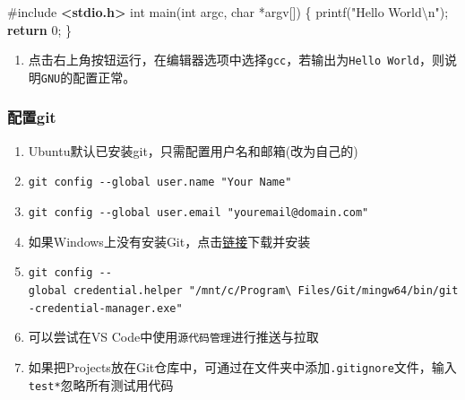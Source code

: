 \documentclass[
]{article}
\newenvironment{Shaded}{}{}
\newcommand{\ControlFlowTok}[1]{\textcolor[rgb]{0.00,0.44,0.13}{\textbf{#1}}}
\newcommand{\DataTypeTok}[1]{\textcolor[rgb]{0.56,0.13,0.00}{#1}}
\newcommand{\DecValTok}[1]{\textcolor[rgb]{0.25,0.63,0.44}{#1}}
\newcommand{\ImportTok}[1]{\textcolor[rgb]{0.00,0.50,0.00}{\textbf{#1}}}
\newcommand{\NormalTok}[1]{#1}
\newcommand{\OperatorTok}[1]{\textcolor[rgb]{0.40,0.40,0.40}{#1}}
\newcommand{\PreprocessorTok}[1]{\textcolor[rgb]{0.74,0.48,0.00}{#1}}
\newcommand{\SpecialCharTok}[1]{\textcolor[rgb]{0.25,0.44,0.63}{#1}}
\newcommand{\StringTok}[1]{\textcolor[rgb]{0.25,0.44,0.63}{#1}}
\begin{document}
\begin{Shaded}
	\begin{Highlighting}[]
		\PreprocessorTok{\#include }\ImportTok{\textless{}stdio.h\textgreater{}}
		\DataTypeTok{int}\NormalTok{ main}\OperatorTok{(}\DataTypeTok{int}\NormalTok{ argc}\OperatorTok{,} \DataTypeTok{char} \OperatorTok{*}\NormalTok{argv}\OperatorTok{[])}
		\OperatorTok{\{}
		\NormalTok{    printf}\OperatorTok{(}\StringTok{"Hello World}\SpecialCharTok{\textbackslash{}n}\StringTok{"}\OperatorTok{);}
		\ControlFlowTok{return} \DecValTok{0}\OperatorTok{;}
		\OperatorTok{\}}
	\end{Highlighting}
\end{Shaded}

\begin{enumerate}[resume]
	\def\labelenumi{\arabic{enumi}.}
	\item
	      点击右上角按钮运行，在编辑器选项中选择\texttt{gcc}，若输出为\texttt{Hello\ World}，则说明\texttt{GNU}的配置正常。
\end{enumerate}

\subsubsection{配置git}\label{ux914dux7f6egit}

\begin{enumerate}
	\def\labelenumi{\arabic{enumi}.}
	\item
	      Ubuntu默认已安装git，只需配置用户名和邮箱(改为自己的)
	\item
	      \texttt{git\ config\ -\/-global\ user.name\ "Your\ Name"}
	\item
	      \texttt{git\ config\ -\/-global\ user.email\ "youremail@domain.com"}
	\item
	      如果Windows上没有安装Git，点击\href{https://github.com/git-for-windows/git/releases/}{链接}下载并安装
	\item
	      \texttt{git\ config\ -\/-global\ credential.helper\ "/mnt/c/Program\textbackslash{}\ Files/Git/mingw64/bin/git-credential-manager.exe"}
	\item
	      可以尝试在VS Code中使用\texttt{源代码管理}进行推送与拉取
	\item
	      如果把Projects放在Git仓库中，可通过在文件夹中添加\texttt{.gitignore}文件，输入\texttt{test*}忽略所有测试用代码
\end{enumerate}
\end{document}
